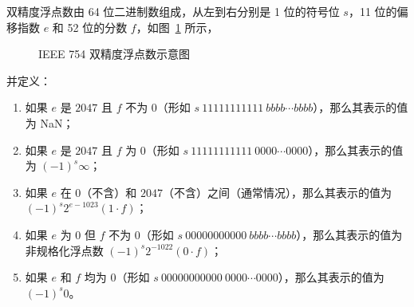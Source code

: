             双精度浮点数由 64 位二进制数组成，从左到右分别是 1 位的符号位 $s$，11 位的偏移指数 $e$ 和 52 位的分数 $f$，如图~\ref{fig:NumberSystemBasics/fixed-point-and-floating-point/ieee-754/basic-format/double} 所示，
            \begin{figure}
                \centering
                \caption{IEEE 754 双精度浮点数示意图}
                \label{fig:NumberSystemBasics/fixed-point-and-floating-point/ieee-754/basic-format/double}
            \end{figure}

            并定义：
            \begin{enumerate}
                \item 如果 $e$ 是 $2047$ 且 $f$ 不为 $0$（形如 $s\ 11111111111\ bbbb \cdots bbbb$），那么其表示的值为 NaN；
                \item 如果 $e$ 是 $2047$ 且 $f$ 为 $0$（形如 $s\ 11111111111\ 0000 \cdots 0000$），那么其表示的值为 $(-1)^s\infty$；
                \item 如果 $e$ 在 $0$（不含）和 $2047$（不含）之间（通常情况），那么其表示的值为 $(-1)^s2^{e-1023}(1 \cdot f)$；
                \item 如果 $e$ 为 $0$ 但 $f$ 不为 $0$（形如 $s\ 00000000000\ bbbb \cdots bbbb$），那么其表示的值为非规格化浮点数 $(-1)^s2^{-1022}(0 \cdot f)$；
                \item 如果 $e$ 和 $f$ 均为 $0$（形如 $s\ 00000000000\ 0000 \cdots 0000$），那么其表示的值为 $(-1)^s0$。
            \end{enumerate}
